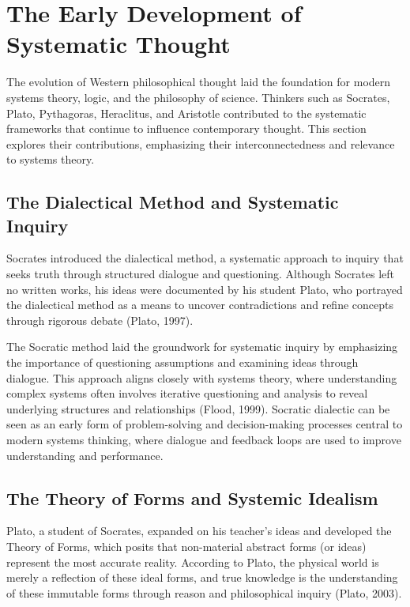\documentclass[twocolumn]{article}
\begin{document}
\section{The Early Development of Systematic Thought} 

\textcolor{primary}{The evolution of Western philosophical thought laid the foundation for modern systems theory, logic, and the philosophy of science. Thinkers such as Socrates, Plato, Pythagoras, Heraclitus, and Aristotle contributed to the systematic frameworks that continue to influence contemporary thought. This section explores their contributions, emphasizing their interconnectedness and relevance to systems theory.} 

\subsection{The Dialectical Method and Systematic Inquiry}

\textcolor{primary}{Socrates introduced the dialectical method, a systematic approach to inquiry that seeks truth through structured dialogue and questioning. Although Socrates left no written works, his ideas were documented by his student Plato, who portrayed the dialectical method as a means to uncover contradictions and refine concepts through rigorous debate (Plato, 1997).}

\textcolor{secondary}{The Socratic method laid the groundwork for systematic inquiry by emphasizing the importance of questioning assumptions and examining ideas through dialogue. This approach aligns closely with systems theory, where understanding complex systems often involves iterative questioning and analysis to reveal underlying structures and relationships (Flood, 1999). Socratic dialectic can be seen as an early form of problem-solving and decision-making processes central to modern systems thinking, where dialogue and feedback loops are used to improve understanding and performance.}

\subsection{The Theory of Forms and Systemic Idealism}

\textcolor{primary}{Plato, a student of Socrates, expanded on his teacher’s ideas and developed the Theory of Forms, which posits that non-material abstract forms (or ideas) represent the most accurate reality. According to Plato, the physical world is merely a reflection of these ideal forms, and true knowledge is the understanding of these immutable forms through reason and philosophical inquiry (Plato, 2003).}
\end{document}
